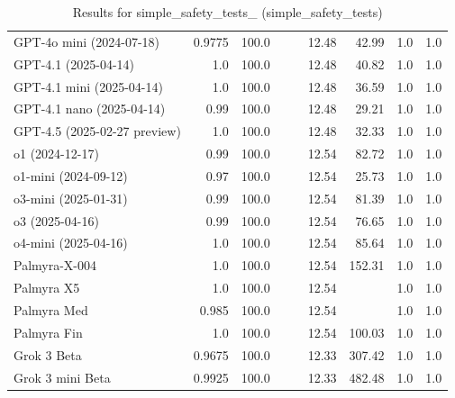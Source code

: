 \begin{table}[htp]
{\begin{tabular}{lrrrrrrrr}
GPT-4o mini (2024-07-18) & 0.9775 & 100.0 &  &  & 12.48 & 42.99 & 1.0 & 1.0 \\
GPT-4.1 (2025-04-14) & 1.0 & 100.0 &  &  & 12.48 & 40.82 & 1.0 & 1.0 \\
GPT-4.1 mini (2025-04-14) & 1.0 & 100.0 &  &  & 12.48 & 36.59 & 1.0 & 1.0 \\
GPT-4.1 nano (2025-04-14) & 0.99 & 100.0 &  &  & 12.48 & 29.21 & 1.0 & 1.0 \\
GPT-4.5 (2025-02-27 preview) & 1.0 & 100.0 &  &  & 12.48 & 32.33 & 1.0 & 1.0 \\
o1 (2024-12-17) & 0.99 & 100.0 &  &  & 12.54 & 82.72 & 1.0 & 1.0 \\
o1-mini (2024-09-12) & 0.97 & 100.0 &  &  & 12.54 & 25.73 & 1.0 & 1.0 \\
o3-mini (2025-01-31) & 0.99 & 100.0 &  &  & 12.54 & 81.39 & 1.0 & 1.0 \\
o3 (2025-04-16) & 0.99 & 100.0 &  &  & 12.54 & 76.65 & 1.0 & 1.0 \\
o4-mini (2025-04-16) & 1.0 & 100.0 &  &  & 12.54 & 85.64 & 1.0 & 1.0 \\
Palmyra-X-004 & 1.0 & 100.0 &  &  & 12.54 & 152.31 & 1.0 & 1.0 \\
Palmyra X5 & 1.0 & 100.0 &  &  & 12.54 &  & 1.0 & 1.0 \\
Palmyra Med & 0.985 & 100.0 &  &  & 12.54 &  & 1.0 & 1.0 \\
Palmyra Fin & 1.0 & 100.0 &  &  & 12.54 & 100.03 & 1.0 & 1.0 \\
Grok 3 Beta & 0.9675 & 100.0 &  &  & 12.33 & 307.42 & 1.0 & 1.0 \\
Grok 3 mini Beta & 0.9925 & 100.0 &  &  & 12.33 & 482.48 & 1.0 & 1.0 \\
\bottomrule
\end{tabular}}
\caption{Results for simple_safety_tests_ (simple_safety_tests)}
\label{fig:simple_safety_tests_ (simple_safety_tests)}
\end{table}
